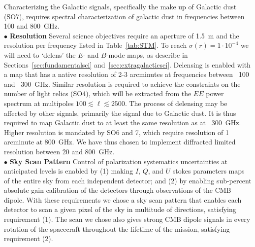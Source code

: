 \documentclass[PICOReport.tex]{subfiles}
\begin{document}
Characterizing the Galactic signals, specifically the make up of Galactic dust (SO7), requires spectral characterization 
of galactic dust in frequencies between 100 and 800~GHz. \\ 
%
$\bullet$ {\bf Resolution} \hspace{0.1in} 
Several science objectives require an aperture of 1.5~m and the resolution per frequency listed in Table~\ref{tab:STM}. To reach $\sigma(r) = 1\cdot10^{-4}$ we will need to `delens' the $E$- and $B$-mode maps, as describe in Sections~\ref{sec:fundamentalsci} and~\ref{sec:extragalacticsci}. Delensing is enabled with a map that has a native resolution of 2-3 arcminutes at frequencies between ~100 and ~300~GHz. Similar resolution is required to achieve the constraints on the number of light relics (SO4), which will be extracted from the $EE$ power spectrum at multipoles $100 \lesssim \ell \lesssim 2500$.  The process of delensing may be affected by other signals, primarily the signal due to Galactic dust. It is thus required to map Galactic dust to at least the same resolution as at ~300~GHz. Higher resolution is mandated by SO6 and 7, which require resolution of 1 arcminute at 800~GHz.  We have thus chosen to implement diffracted limited resolution between 20 and 800~GHz. \\
%
$\bullet$ {\bf Sky Scan Pattern} \hspace{0.1in} 
Control of polarization systematics uncertainties at anticipated levels is enabled by (1) making $I$, $Q$, and $U$ stokes parameters maps of the entire sky from each independent detector; and (2) by enabling sub-percent absolute gain calibration of the detectors through observations of the CMB dipole.  With these requirements we chose a sky scan pattern that enables each detector to scan a given pixel of the sky in multitude of directions, satisfying requirement (1). The scan we chose also gives strong CMB dipole signals in every rotation of the spacecraft throughout the lifetime of the mission, satisfying requirement (2). 

 
\end{document}
